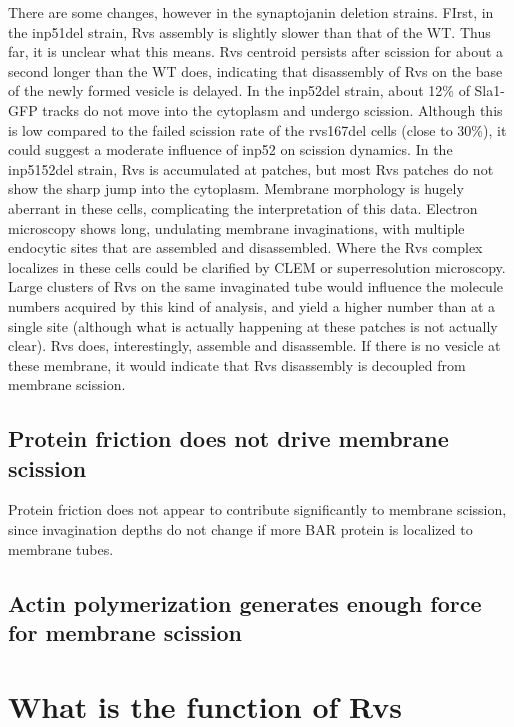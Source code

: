 There are some changes, however in the synaptojanin deletion strains. FIrst, in the inp51del strain, Rvs assembly is slightly slower than that of the WT. Thus far, it is unclear what this means. Rvs centroid persists after scission for about a second longer than the WT does, indicating that disassembly of Rvs on the base of the newly formed vesicle is delayed. In the inp52del strain, about 12\% of Sla1-GFP tracks do not move into the cytoplasm and undergo scission. Although this is low compared to the failed scission rate of the rvs167del cells (close to 30\%), it could suggest a moderate influence of inp52 on scission dynamics. In the inp5152del strain, Rvs is accumulated at patches, but most Rvs patches do not show the sharp jump into the cytoplasm. Membrane morphology is hugely aberrant in these cells, complicating the interpretation of this data. 
Electron microscopy shows long, undulating membrane invaginations, with multiple endocytic sites that are assembled and disassembled. Where the Rvs complex localizes in these cells could be clarified by CLEM or superresolution microscopy. Large clusters of Rvs on the same invaginated tube would influence the molecule numbers acquired by this kind of analysis, and yield a higher number than at a single site (although what is actually happening at these patches is not actually clear). Rvs does, interestingly, assemble and disassemble. If there is no vesicle at these membrane, it would indicate that Rvs disassembly is decoupled from membrane scission.


\subsection{Protein friction does not drive membrane scission}
Protein friction does not appear to contribute significantly to membrane scission, since invagination depths do not change if more BAR protein is localized to membrane tubes. 

\subsection{ Actin polymerization generates enough force for membrane scission}

\section{What is the function of Rvs}
